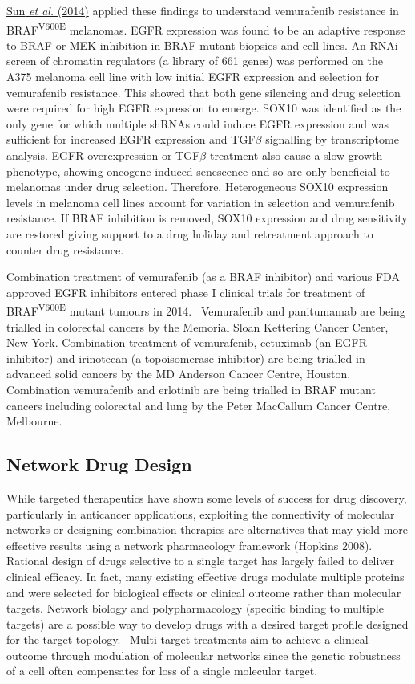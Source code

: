 \hyperlink{ENREF92}{Sun}\hyperlink{ENREF92}{\textit{ et
al.}}\hyperlink{ENREF92}{ (2014)} applied these findings to understand
vemurafenib resistance in BRAF\textsuperscript{V600E} melanomas. EGFR
expression was found to be an adaptive response to BRAF or MEK
inhibition in BRAF mutant biopsies and cell lines. An RNAi screen of
chromatin regulators (a library of 661 genes) was performed on the A375
melanoma cell line with low initial EGFR expression and selection for
vemurafenib resistance. This showed that both gene silencing and drug
selection were required for high EGFR expression to emerge. SOX10 was
identified as the only gene for which multiple shRNAs could induce EGFR
expression and was sufficient for increased EGFR expression and
TGF$\beta $ signalling by transcriptome analysis. EGFR overexpression
or TGF$\beta $ treatment also cause a slow growth phenotype, showing
oncogene-induced senescence and so are only beneficial to melanomas
under drug selection. Therefore, Heterogeneous SOX10 expression
levels in melanoma cell lines account for variation in selection and
vemurafenib resistance. If BRAF inhibition is removed, SOX10
expression and drug sensitivity are restored giving support to a drug
holiday and retreatment approach to counter drug resistance. 


Combination treatment of vemurafenib (as a BRAF inhibitor) and various
FDA approved EGFR inhibitors entered phase I clinical trials for
treatment of BRAF\textsuperscript{V600E} mutant tumours in 2014.
\ Vemurafenib and panitumamab are being trialled in colorectal cancers
by the Memorial Sloan Kettering Cancer Center, New York. Combination
treatment of vemurafenib, cetuximab (an EGFR inhibitor) and irinotecan
(a topoisomerase inhibitor) are being trialled in advanced solid
cancers by the MD Anderson Cancer Centre, Houston. Combination
vemurafenib and erlotinib are being trialled in BRAF mutant cancers
including colorectal and lung by the Peter MacCallum Cancer Centre,
Melbourne. 


\subsection[Network Drug Design]{Network Drug Design}

While targeted therapeutics have shown some levels of success for drug
discovery, particularly in anticancer applications, exploiting the
connectivity of molecular networks or designing combination therapies
are alternatives that may yield more effective results using a network
pharmacology framework (Hopkins 2008). Rational design of drugs
selective to a single target has largely failed to deliver clinical
efficacy. In fact, many existing effective drugs modulate multiple
proteins and were selected for biological effects or clinical outcome
rather than molecular targets. Network biology and polypharmacology
(specific binding to multiple targets) are a possible way to develop
drugs with a desired target profile designed for the target topology.
\ Multi-target treatments aim to achieve a clinical outcome through
modulation of molecular networks since the genetic robustness of a cell
often compensates for loss of a single molecular target. 


